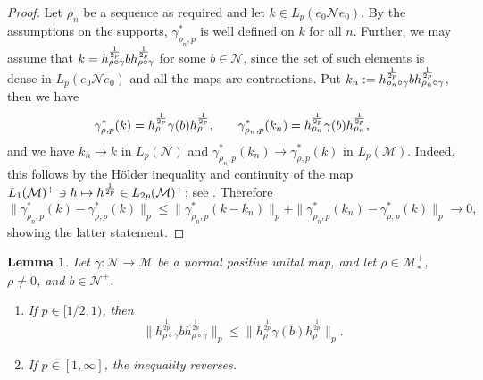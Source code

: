 \documentclass[12pt]{article}
\newtheorem{lemma}[theorem]{Lemma}
\theoremstyle{definition}
\theoremstyle{remark}
\numberwithin{equation}{section}
\def\Me{\mathcal M}
\def\Ne{\mathcal N}
\begin{document}
\begin{proof}
Let $\rho_n$ be a sequence as required and let $k\in L_p(e_0 \Ne e_0)$. By the
assumptions on the supports, $\gamma^*_{\rho_n,p}$ is well defined on $k$ for all $n$.
Further, we may assume that $k=h_{\rho\circ\gamma}^{1\over 2p}b
h_{\rho\circ\gamma}^{1\over 2p}$ for some $b\in \Ne$, since the set of such elements is
dense in $L_p(e_0 \Ne e_0)$ and all the maps are contractions. 
Put $k_n:=h_{\rho_n\circ\gamma}^{1\over 2p}b
h_{\rho_n\circ\gamma}^{1\over 2p}$, then we have
\[
\gamma^*_{\rho,p}(k)={h_\rho^{1\over2p}\gamma(b)h_\rho^{1\over2p},}\qquad
\gamma^*_{\rho_n,p}(k_n)= {h_{\rho_n}^{1\over2p}\gamma(b)h_{\rho_n}^{1\over2p},}
\]
and we have $k_n\to k$ in $L_p(\Ne)$ and  $\gamma^*_{\rho_n,p}(k_n)\to
\gamma^*_{\rho,p}(k)$ in $L_p(\Me)$. Indeed, this follows by the H\"older inequality and continuity
of the map $L_1(\Me)^+\ni h\mapsto {h^{1\over2p}\in L_{2p}(\Me)^+}$; see
\cite[Lemma 3.4]{kosaki1984applicationsuc}. Therefore
\[
\|\gamma^*_{\rho_n,p}(k)-\gamma^*_{\rho,p}(k)\|_p\le
\|\gamma^*_{\rho_n,p}(k-k_n)\|_p+\|\gamma^*_{\rho_n,p}(k_n)-\gamma^*_{\rho,p}(k)\|_p\to 0,
\]
showing the latter statement.
\end{proof}


\begin{lemma}\label{lemma:dpi} Let $\gamma:\Ne\to \Me$ be a normal positive unital map, and
let $\rho\in \Me_*^+$, {$\rho\ne0$, and} $b\in \Ne^+$. 
\begin{enumerate}
\item[(i)]  If $p\in [1/2,1)$, then 
\[
\Big\|h_{\rho\circ\gamma}^{\frac{1}{2p}}bh_{\rho\circ\gamma}^{\frac{1}{2p}}\Big\|_p\le
\Big\|h_{\rho}^{\frac{1}{2p}}\gamma(b)h_{\rho}^{\frac{1}{2p}}\Big\|_p.
\]

\item[(ii)]  If $p\in [1,\infty]$, the inequality reverses.
\end{enumerate}
\end{lemma}
\end{document}
